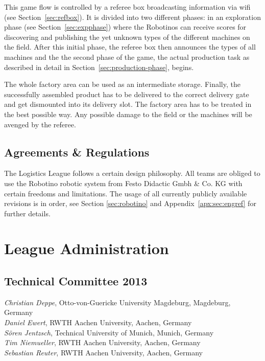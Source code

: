 \documentclass[12pt,twoside]{article}
\newcommand{\refsec}[1]{Section~\ref{#1}}
\begin{document}
This game flow is controlled by a referee box broadcasting information
via wifi (see \refsec{sec:refbox}). It is divided into two different
phases: in an exploration phase (see \refsec{sec:expphase}) where the
Robotinos can receive scores for discovering and publishing the yet
unknown types of the different machines on the field. After this
initial phase, the referee box then announces the types of all
machines and the the second phase of the game, the actual production
task as described in detail in \refsec{sec:production-phase}, begins.

The whole factory area can be used as an intermediate
storage. Finally, the successfully assembled product has to be
delivered to the correct delivery gate and get dismounted into its
delivery slot. The factory area has to be treated in the best possible
way. Any possible damage to the field or the machines will be avenged
by the referee.

\subsection{Agreements \& Regulations} \label{sec:agreements}

The Logistics League follows a certain design philosophy. All teams
are obliged to use the Robotino robotic system from Festo Didactic
Gmbh \& Co. KG with certain freedoms and limitations. The usage of all
currently publicly available revisions is in order, see Section
\ref{sec:robotino} and Appendix~\ref{apx:sec:engref} for further
details.




\section{League Administration} \label{sec:commitees}
\subsection{Technical Committee 2013} \label{sec:tc}
\emph{Christian Deppe}, Otto-von-Guericke University Magdeburg, Magdeburg,
Germany\\
\emph{Daniel Ewert}, RWTH Aachen University, Aachen, Germany\\
\emph{S\"oren Jentzsch}, Technical University of Munich, Munich, Germany\\
\emph{Tim Niemueller}, RWTH Aachen University, Aachen, Germany\\
\emph{Sebastian Reuter}, RWTH Aachen University, Aachen, Germany
\end{document}
